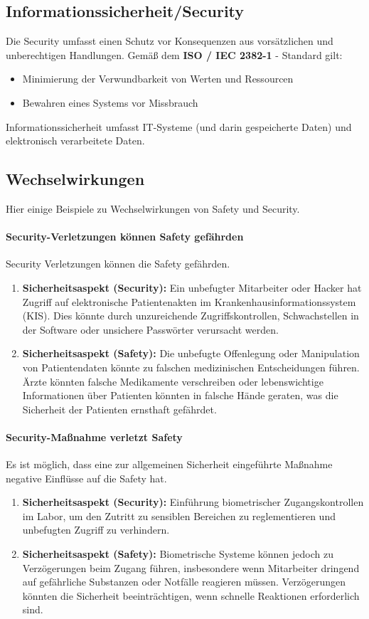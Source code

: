 \documentclass{report}
\begin{document}
\subsection{Informationssicherheit/Security}
Die Security umfasst einen Schutz vor Konsequenzen aus vorsätzlichen und unberechtigen Handlungen.
Gemäß dem \textbf{ ISO / IEC 2382-1} - Standard gilt:
\begin{itemize}
    \item Minimierung der Verwundbarkeit von Werten und Ressourcen
    \item Bewahren eines Systems vor Missbrauch
\end{itemize}
Informationssicherheit umfasst IT-Systeme (und darin gespeicherte Daten) und  elektronisch verarbeitete Daten.
\subsection{Wechselwirkungen}
Hier einige Beispiele zu Wechselwirkungen von Safety und Security.
\paragraph{Security-Verletzungen können Safety gefährden} Security Verletzungen können die Safety gefährden.
\begin{enumerate}[label=\arabic*.]
    \item \textbf{Sicherheitsaspekt (Security):} Ein unbefugter Mitarbeiter oder Hacker hat Zugriff auf elektronische Patientenakten im Krankenhausinformationssystem (KIS). Dies könnte durch unzureichende Zugriffskontrollen, Schwachstellen in der Software oder unsichere Passwörter verursacht werden.

    \item \textbf{Sicherheitsaspekt (Safety):} Die unbefugte Offenlegung oder Manipulation von Patientendaten könnte zu falschen medizinischen Entscheidungen führen. Ärzte könnten falsche Medikamente verschreiben oder lebenswichtige Informationen über Patienten könnten in falsche Hände geraten, was die Sicherheit der Patienten ernsthaft gefährdet.
\end{enumerate}
\paragraph{Security-Maßnahme verletzt Safety} Es ist möglich, dass eine zur allgemeinen Sicherheit eingeführte Maßnahme negative Einflüsse auf die Safety hat.
\begin{enumerate}[label=\arabic*.]
    \item \textbf{Sicherheitsaspekt (Security):} Einführung biometrischer Zugangskontrollen im Labor, um den Zutritt zu sensiblen Bereichen zu reglementieren und unbefugten Zugriff zu verhindern.

    \item \textbf{Sicherheitsaspekt (Safety):} Biometrische Systeme können jedoch zu Verzögerungen beim Zugang führen, insbesondere wenn Mitarbeiter dringend auf gefährliche Substanzen oder Notfälle reagieren müssen. Verzögerungen könnten die Sicherheit beeinträchtigen, wenn schnelle Reaktionen erforderlich sind.
\end{enumerate}
\end{document}
